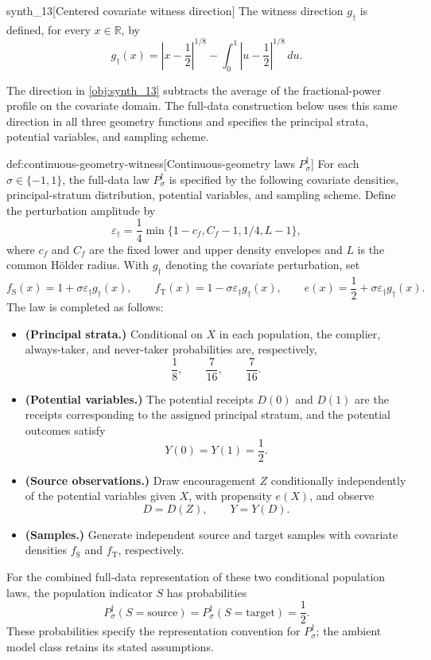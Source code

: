 \documentclass[11pt]{article}
\begin{document}
\begin{definitionv}{synth_13}[Centered covariate witness direction]
The witness direction \(g_{\dagger}\) is defined, for every \(x\in\mathbb R\), by
\[
g_{\dagger}(x)
=
\left|x-\frac12\right|^{1/8}
-
\int_0^1 \left|u-\frac12\right|^{1/8}\,du.
\]
\end{definitionv}

The direction  in \cref{obj:synth_13} subtracts the average of the fractional-power profile on the covariate domain. The full-data construction below uses this same direction in all three geometry functions and specifies the principal strata, potential variables, and sampling scheme.

\begin{definitionv}{def:continuous-geometry-witness}[Continuous-geometry laws $P_{\sigma}^{\dagger}$]
For each \(\sigma\in\{-1,1\}\), the full-data law \(P_{\sigma}^{\dagger}\) is specified by the following covariate densities, principal-stratum distribution, potential variables, and sampling scheme. Define the perturbation amplitude by
\[
\varepsilon_{\dagger}
=
\frac14\min\{1-c_f,C_f-1,1/4,L-1\},
\]
where \(c_f\) and \(C_f\) are the fixed lower and upper density envelopes and \(L\) is the common Hölder radius. With \(g_{\dagger}\) denoting the covariate perturbation, set
\[
f_{\mathrm S}(x)=1+\sigma\varepsilon_{\dagger}g_{\dagger}(x),
\qquad
f_{\mathrm T}(x)=1-\sigma\varepsilon_{\dagger}g_{\dagger}(x),
\qquad
e(x)=\frac12+\sigma\varepsilon_{\dagger}g_{\dagger}(x).
\]
The law is completed as follows:
\begin{itemize}
\item \textbf{(Principal strata.)} Conditional on \(X\) in each population, the complier, always-taker, and never-taker probabilities are, respectively,
\[
\frac18,\qquad \frac7{16},\qquad \frac7{16}.
\]
\item \textbf{(Potential variables.)} The potential receipts \(D(0)\) and \(D(1)\) are the receipts corresponding to the assigned principal stratum, and the potential outcomes satisfy
\[
Y(0)=Y(1)=\frac12.
\]
\item \textbf{(Source observations.)} Draw encouragement \(Z\) conditionally independently of the potential variables given \(X\), with propensity \(e(X)\), and observe
\[
D=D(Z),\qquad Y=Y(D).
\]
\item \textbf{(Samples.)} Generate independent source and target samples with covariate densities \(f_{\mathrm S}\) and \(f_{\mathrm T}\), respectively.
\end{itemize}
For the combined full-data representation of these two conditional population laws, the population indicator \(S\) has probabilities
\[
P_{\sigma}^{\dagger}(S=\mathrm{source})
=
P_{\sigma}^{\dagger}(S=\mathrm{target})
=
\frac12.
\]
These probabilities specify the representation convention for \(P_{\sigma}^{\dagger}\); the ambient model class retains its stated assumptions.
\end{definitionv}
\end{document}
